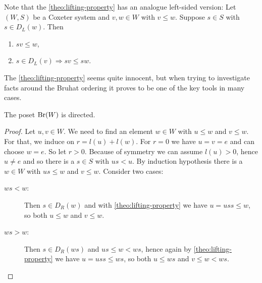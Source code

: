 \begin{rema}
	Note that the \ref{theo:lifting-property} has an analogue left-sided version: Let $(W,S)$ be a Coxeter system and $v,w \in W$ with $v \leq w$. Suppose $s \in S$ with $s \in D_L(w)$. Then
	\begin{enumerate}
		\item $sv \leq w$,
		\item $s \in D_L(v) \Rightarrow sv \leq sw$.
	\end{enumerate}
\end{rema}

The \ref{theo:lifting-property} seems quite innocent, but when trying to investigate facts around the Bruhat ordering it proves to be one of the key tools in many cases.

\begin{prop}
	The poset $\operatorname{Br}(W)$ is directed.

	\begin{proof}
		Let $u,v \in W$. We need to find an element $w \in W$ with $u \leq w$ and $v \leq w$. For that, we induce on $r = l(u) + l(w)$. For $r = 0$ we have $u = v = e$ and can choose $w = e$. So let $r > 0$. Because of symmetry we can assume $l(u) > 0$, hence $u \neq e$ and so there is a $s \in S$ with $us < u$. By induction hypothesis there is a $w \in W$ with $us \leq w$ and  $v \leq w$. Consider two cases:

		\begin{description}
			\item[$ws < w$:] Then $s \in D_R(w)$ and with \ref{theo:lifting-property} we have $u = uss \leq w$, so both $u \leq w$ and $v \leq w$.
			\item[$ws > w$:] Then $s \in D_R(w s)$ and $u s \leq w < w s$, hence again by \ref{theo:lifting-property} we have $u = uss \leq w s$, so both $u \leq ws$ and $v \leq w < ws$. \qedhere
		\end{description}
	\end{proof}
\end{prop}

